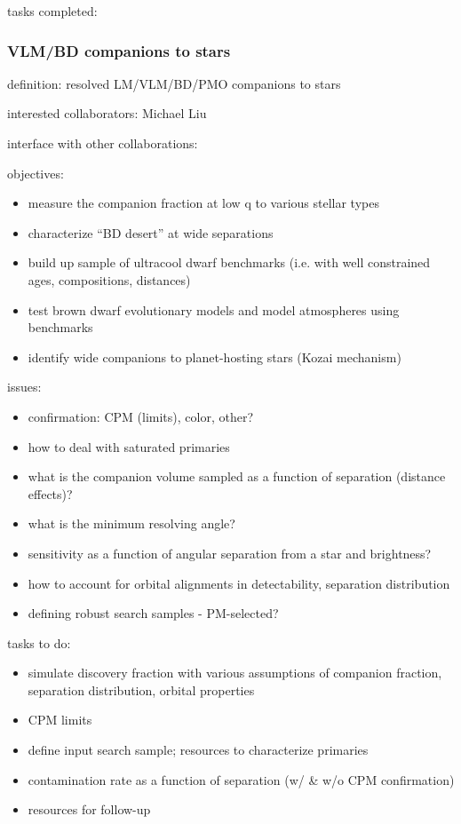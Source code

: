 tasks completed: 



\subsubsection{VLM/BD companions to stars}

definition: resolved LM/VLM/BD/PMO companions to stars 

interested collaborators: 
Michael Liu  

interface with other collaborations:  

objectives: 
\begin{itemize}
\item{measure 
the companion fraction at low q to various stellar types }
\item{characterize 
“BD desert” at wide separations }
\item{build 
up sample of ultracool dwarf benchmarks (i.e. with well constrained ages, 
compositions, distances) }
\item{test 
brown dwarf evolutionary models and model atmospheres using benchmarks }
\item{identify 
wide companions to planet-hosting stars (Kozai mechanism) }
\end{itemize}

issues: 
\begin{itemize}
\item{confirmation: 
CPM (limits), color, other? }
\item{how 
to deal with saturated primaries }
\item{ what 
is the companion volume sampled as a function of separation (distance effects)?}
\item{what 
is the minimum resolving angle? }
\item{sensitivity 
as a function of angular separation from a star and brightness? }
\item{how 
to account for orbital alignments in detectability, separation distribution }
\item{ defining robust search samples - PM-selected? }
\end{itemize}


tasks to do: 
\begin{itemize}
\item{simulate 
discovery fraction with various assumptions of companion fraction, separation 
distribution, orbital properties }
\item{CPM limits }
\item{define 
input search sample; resources to characterize primaries }
\item{contamination 
rate as a function of separation (w/ \& w/o CPM confirmation) }
\item{resources for follow-up }
\end{itemize}


